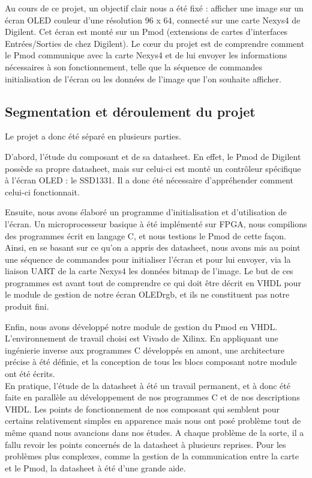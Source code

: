 \documentclass[11pt]{article}
\begin{document}
Au cours de ce projet, un objectif clair nous a été fixé : afficher une image sur un écran OLED couleur d'une résolution 96 x 64, connecté sur une carte Nexys4 de Digilent. Cet écran est monté sur un Pmod (extensions de cartes d'interfaces Entrées/Sorties de chez Digilent). Le cœur du projet est de comprendre comment le Pmod communique avec la carte Nexys4 et de lui envoyer les informations nécessaires à son fonctionnement, telle que la séquence de commandes initialisation de l'écran ou les données de l'image que l'on souhaite afficher. \\

\subsection{Segmentation et déroulement du projet}

Le projet a donc été séparé en plusieurs parties. 

D'abord, l'étude du composant et de sa datasheet. En effet, le Pmod de Digilent possède sa propre datasheet, mais sur celui-ci est monté un contrôleur spécifique à l'écran OLED : le SSD1331. Il a donc été nécessaire d’appréhender comment celui-ci fonctionnait. 

Ensuite, nous avons élaboré un programme d'initialisation et d'utilisation de l'écran. Un microprocesseur basique à été implémenté sur FPGA, nous compilions des programmes écrit en langage C, et nous testions le Pmod de cette façon. Ainsi, en se basant sur ce qu'on a appris des datasheet, nous avons mis au point une séquence de commandes pour initialiser l'écran et pour lui envoyer, via la liaison UART de la carte Nexys4 les données bitmap de l'image. Le but de ces programmes est avant tout de comprendre ce qui doit être décrit en VHDL pour le module de gestion de notre écran OLEDrgb, et ils ne constituent pas notre produit fini. 

Enfin, nous avons développé notre module de gestion du Pmod en VHDL. L’environnement de travail choisi est Vivado de Xilinx. En appliquant une ingénierie inverse aux programmes C développés en amont, une architecture précise à été définie, et la conception de tous les blocs composant notre module ont été écrits. \\

En pratique, l'étude de la datasheet à été un travail permanent, et à donc été faite en parallèle au développement de nos programmes C et de nos descriptions VHDL. Les points de fonctionnement de nos composant qui semblent pour certains relativement simples en apparence mais nous ont posé problème tout de même quand nous avancions dans nos études. A chaque problème de la sorte, il a fallu revoir les points concernés de la datasheet à plusieurs reprises. Pour les problèmes plus complexes, comme la gestion de la communication entre la carte et le Pmod, la datasheet à été d'une grande aide. 
\end{document}
